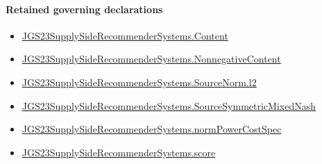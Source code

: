 \documentclass[10pt]{article}
\begin{document}
\paragraph{Retained governing declarations}
\begin{itemize}\raggedright
\item \hyperlink{governing-declaration-367305fda50f0ada}{JGS23\allowbreak{}Supply\allowbreak{}Side\allowbreak{}Recommender\allowbreak{}Systems.\allowbreak{}Content}
\item \hyperlink{governing-declaration-d426babe40b9593c}{JGS23\allowbreak{}Supply\allowbreak{}Side\allowbreak{}Recommender\allowbreak{}Systems.\allowbreak{}Nonnegative\allowbreak{}Content}
\item \hyperlink{governing-declaration-9299663ffe3ecb38}{JGS23\allowbreak{}Supply\allowbreak{}Side\allowbreak{}Recommender\allowbreak{}Systems.\allowbreak{}Source\allowbreak{}Norm.\allowbreak{}l2}
\item \hyperlink{governing-declaration-8919e7334fa5ab60}{JGS23\allowbreak{}Supply\allowbreak{}Side\allowbreak{}Recommender\allowbreak{}Systems.\allowbreak{}Source\allowbreak{}Symmetric\allowbreak{}Mixed\allowbreak{}Nash}
\item \hyperlink{governing-declaration-6ba13dc1cae95e6e}{JGS23\allowbreak{}Supply\allowbreak{}Side\allowbreak{}Recommender\allowbreak{}Systems.\allowbreak{}norm\allowbreak{}Power\allowbreak{}Cost\allowbreak{}Spec}
\item \hyperlink{governing-declaration-e3725af4eb21c4db}{JGS23\allowbreak{}Supply\allowbreak{}Side\allowbreak{}Recommender\allowbreak{}Systems.\allowbreak{}score}
\end{itemize}
\end{document}
